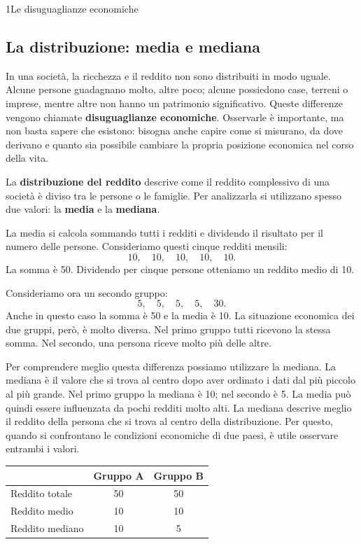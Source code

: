 \begin{lettura}{1}{Le disuguaglianze economiche}

\subsection*{La distribuzione: media e mediana}
In una società, la ricchezza e il reddito non sono distribuiti in modo uguale. Alcune persone guadagnano molto, altre poco; alcune possiedono case, terreni o imprese, mentre altre non hanno un patrimonio significativo. Queste differenze vengono chiamate \textbf{disuguaglianze economiche}. Osservarle è importante, ma non basta sapere che esistono: bisogna anche capire come si misurano, da dove derivano e quanto sia possibile cambiare la propria posizione economica nel corso della vita.

La \textbf{distribuzione del reddito} descrive come il reddito complessivo di una società è diviso tra le persone o le famiglie. Per analizzarla si utilizzano spesso due valori: la \textbf{media} e la \textbf{mediana}.

La media si calcola sommando tutti i redditi e dividendo il risultato per il numero delle persone. Consideriamo questi cinque redditi mensili:
\[
10,\quad 10,\quad 10,\quad 10,\quad 10.
\]
La somma è 50. Dividendo per cinque persone otteniamo un reddito medio di 10.

Consideriamo ora un secondo gruppo:
\[
5,\quad 5,\quad 5,\quad 5,\quad 30.
\]
Anche in questo caso la somma è 50 e la media è 10. La situazione economica dei due gruppi, però, è molto diversa. Nel primo gruppo tutti ricevono la stessa somma. Nel secondo, una persona riceve molto più delle altre.

Per comprendere meglio questa differenza possiamo utilizzare la mediana. La mediana è il valore che si trova al centro dopo aver ordinato i dati dal più piccolo al più grande. Nel primo gruppo la mediana è 10; nel secondo è 5. La media può quindi essere influenzata da pochi redditi molto alti. La mediana descrive meglio il reddito della persona che si trova al centro della distribuzione. Per questo, quando si confrontano le condizioni economiche di due paesi, è utile osservare entrambi i valori.

\begin{center}
\begin{minipage}{\linewidth}\centering\small
\begin{tabular}{lcc}
\toprule
 & Gruppo A & Gruppo B \\
\midrule
Reddito totale & 50 & 50 \\
Reddito medio & 10 & 10 \\
Reddito mediano & 10 & 5 \\
\bottomrule
\end{tabular}
\end{minipage}
\end{center}


\end{lettura}
